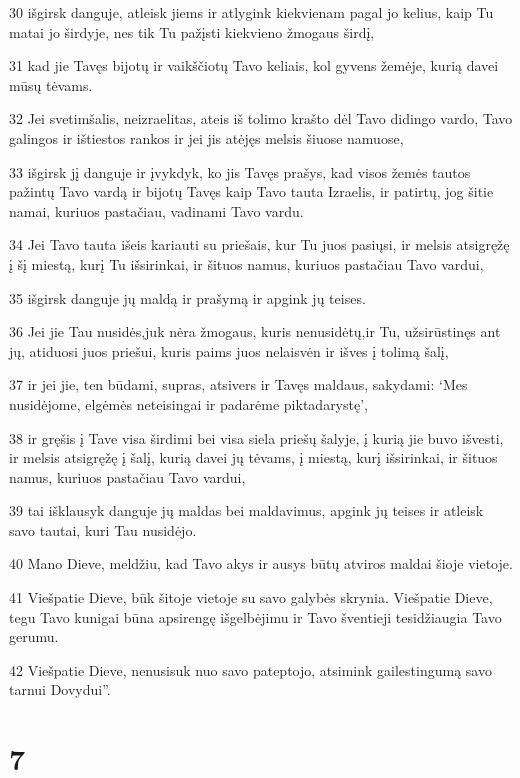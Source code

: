 \par 30 išgirsk danguje, atleisk jiems ir atlygink kiekvienam pagal jo kelius, kaip Tu matai jo širdyje, nes tik Tu pažįsti kiekvieno žmogaus širdį, 
\par 31 kad jie Tavęs bijotų ir vaikščiotų Tavo keliais, kol gyvens žemėje, kurią davei mūsų tėvams. 
\par 32 Jei svetimšalis, neizraelitas, ateis iš tolimo krašto dėl Tavo didingo vardo, Tavo galingos ir ištiestos rankos ir jei jis atėjęs melsis šiuose namuose, 
\par 33 išgirsk jį danguje ir įvykdyk, ko jis Tavęs prašys, kad visos žemės tautos pažintų Tavo vardą ir bijotų Tavęs kaip Tavo tauta Izraelis, ir patirtų, jog šitie namai, kuriuos pastačiau, vadinami Tavo vardu. 
\par 34 Jei Tavo tauta išeis kariauti su priešais, kur Tu juos pasiųsi, ir melsis atsigręžę į šį miestą, kurį Tu išsirinkai, ir šituos namus, kuriuos pastačiau Tavo vardui, 
\par 35 išgirsk danguje jų maldą ir prašymą ir apgink jų teises. 
\par 36 Jei jie Tau nusidės,­juk nėra žmogaus, kuris nenusidėtų,­ir Tu, užsirūstinęs ant jų, atiduosi juos priešui, kuris paims juos nelaisvėn ir išves į tolimą šalį, 
\par 37 ir jei jie, ten būdami, supras, atsivers ir Tavęs maldaus, sakydami: ‘Mes nusidėjome, elgėmės neteisingai ir padarėme piktadarystę’, 
\par 38 ir gręšis į Tave visa širdimi bei visa siela priešų šalyje, į kurią jie buvo išvesti, ir melsis atsigręžę į šalį, kurią davei jų tėvams, į miestą, kurį išsirinkai, ir šituos namus, kuriuos pastačiau Tavo vardui, 
\par 39 tai išklausyk danguje jų maldas bei maldavimus, apgink jų teises ir atleisk savo tautai, kuri Tau nusidėjo. 
\par 40 Mano Dieve, meldžiu, kad Tavo akys ir ausys būtų atviros maldai šioje vietoje. 
\par 41 Viešpatie Dieve, būk šitoje vietoje su savo galybės skrynia. Viešpatie Dieve, tegu Tavo kunigai būna apsirengę išgelbėjimu ir Tavo šventieji tesidžiaugia Tavo gerumu. 
\par 42 Viešpatie Dieve, nenusisuk nuo savo pateptojo, atsimink gailestingumą savo tarnui Dovydui”.



\chapter{7}


